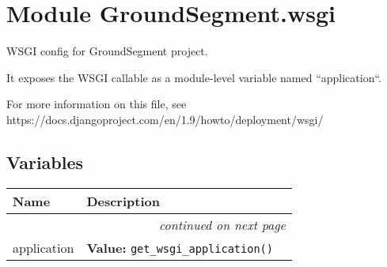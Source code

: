 %
%
%


\section{Module GroundSegment.wsgi}

    \label{GroundSegment:wsgi}
WSGI config for GroundSegment project.

It exposes the WSGI callable as a module-level variable named 
``application``.

For more information on this file, see 
https://docs.djangoproject.com/en/1.9/howto/deployment/wsgi/



  \subsection{Variables}

    \vspace{-1cm}
\hspace{\varindent}\begin{longtable}{|p{\varnamewidth}|p{\vardescrwidth}|l}
\cline{1-2}
\cline{1-2} \centering \textbf{Name} & \centering \textbf{Description}& \\
\cline{1-2}
\endhead\cline{1-2}\multicolumn{3}{r}{\small\textit{continued on next page}}\\\endfoot\cline{1-2}
\endlastfoot\raggedright a\-p\-p\-l\-i\-c\-a\-t\-i\-o\-n\- & \raggedright \textbf{Value:} 
{\tt get\_wsgi\_application()}&\\
\cline{1-2}
\end{longtable}

